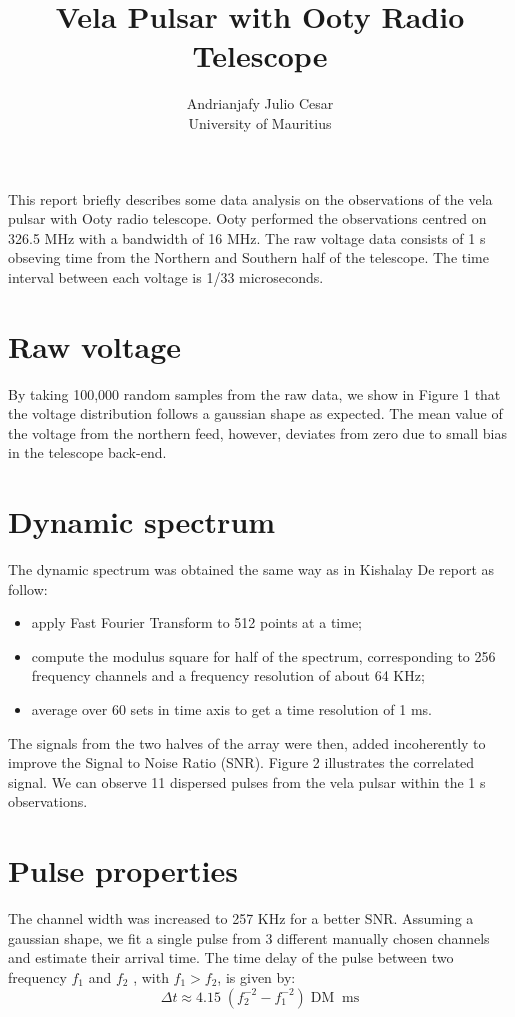 \documentclass[12pt]{article}
\title{Vela Pulsar with Ooty Radio Telescope}
\author{Andrianjafy Julio Cesar \\ University of Mauritius}
\begin{document}
\maketitle
\paragraph{}
This report briefly describes some data analysis on the observations of the vela pulsar with Ooty radio telescope. Ooty performed the observations centred on 326.5 MHz with a bandwidth of 16 MHz. The raw voltage data consists of 1 s obseving time from the Northern and Southern half of the telescope. The time interval between each voltage is 1/33 microseconds.
\begin{multicols}{2}
\section{Raw voltage}

By taking 100,000 random samples from the raw data, we show in Figure 1  that the voltage distribution follows a gaussian shape as expected. The mean value of the voltage from the northern feed, however, deviates from zero due to small bias in the telescope back-end.

\section{Dynamic spectrum}
The dynamic spectrum was obtained the same way as in Kishalay De report as follow:
\begin{itemize}
	\item apply Fast Fourier Transform to 512 points at a time; 
	\item compute the modulus square for half of the spectrum, corresponding to 256 frequency channels and a frequency resolution of about 64 KHz;
	\item average over 60 sets in time axis to get a time resolution of 1 ms.	
	
\end{itemize}

The signals from the two halves of the array were then, added incoherently to improve the Signal to Noise Ratio (SNR). Figure 2 illustrates the correlated signal. We can observe 11 dispersed pulses from the vela pulsar within the 1 s observations. 

\section{Pulse properties}
The channel width was increased to 257 KHz for a better SNR. Assuming a gaussian shape, we fit a single pulse from 3 different manually chosen channels and estimate their arrival time. The time delay of the pulse between two frequency $f_1$ and $f_2$ , with $f_1 > f_2$,  is given by: 
\begin{equation}
\Delta t \approx 4.15 \;(f_2^{-2} - f_1^{-2})\; \mbox{DM} \;\; \mbox{ms}
\end{equation}


\end{multicols}
\end{document}
